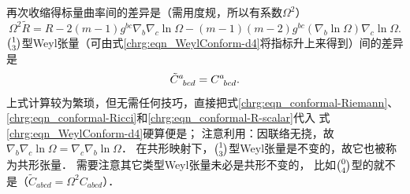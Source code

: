 再次收缩得标量曲率间的差异是（需用度规，所以有系数$\Omega^2$）
\begin{equation}\label{chrg:eqn_conformal-R-scalar}
   \Omega^2\tilde{R}= R -2(m-1) g^{bc} {\nabla}_{b}  {\nabla}_c \ln \Omega
        -(m-1)(m-2)  {g}^{bc}({\nabla}_b \ln\Omega){\nabla}_c \ln\Omega .
\end{equation}
$\binom{1}{3}$型Weyl张量（可由式\eqref{chrg:eqn_WeylConform-d4}将指标升上来得到）间的差异是
\begin{equation}\label{chrg:eqn_conformal-Weyl}
    \tilde{C}_{\hphantom{a} bcd}^a = C_{\hphantom{a} bcd}^a .
\end{equation}
上式计算较为繁琐，但无需任何技巧，直接把式\eqref{chrg:eqn_conformal-Riemann}、
\eqref{chrg:eqn_conformal-Ricci}和\eqref{chrg:eqn_conformal-R-scalar}代入
式\eqref{chrg:eqn_WeylConform-d4}硬算便是；
注意利用：因联络无挠，故$\nabla_b \nabla_c \ln \Omega =\nabla_c \nabla_b \ln \Omega$．
在共形映射下，$\binom{1}{3}$型Weyl张量是不变的，故它也被称为{\heiti 共形张量}．
需要注意其它类型Weyl张量未必是共形不变的，
比如$\binom{0}{4}$型的就不是（$\tilde{C}_{abcd} =\Omega^2 C_{abcd}$）．
